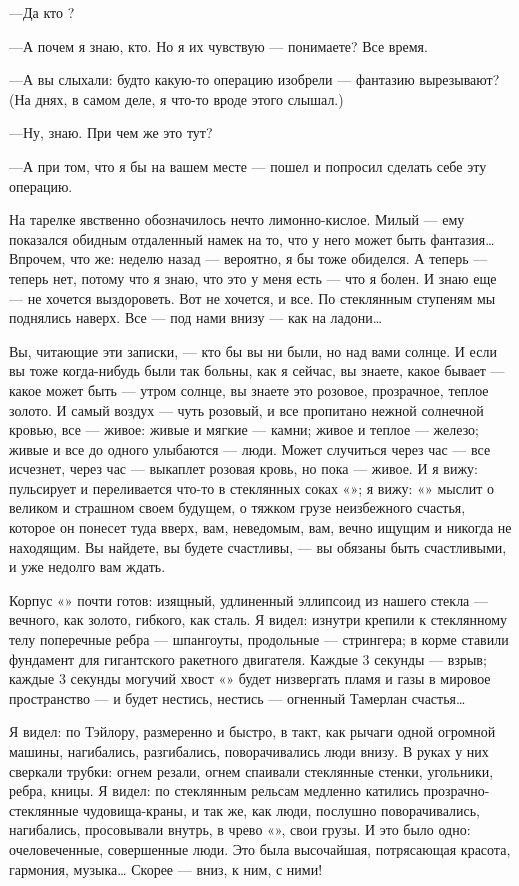 \documentclass[11pt,openany]{book}
\begin{document}
---Да кто ?

---А почем я знаю, кто. Но я их чувствую --- понимаете? Все время.

---А вы слыхали: будто какую-то операцию изобрели --- фантазию вырезывают? (На днях, в самом деле, я что-то вроде этого слышал.)

---Ну, знаю. При чем же это тут?

---А при том, что я бы на вашем месте --- пошел и попросил сделать себе эту операцию.

На тарелке явственно обозначилось нечто лимонно-кислое. Милый --- ему показался обидным отдаленный намек на то, что у него может быть фантазия\ldots{} Впрочем, что же: неделю назад --- вероятно, я бы тоже обиделся. А теперь --- теперь нет, потому что я знаю, что это у меня есть --- что я болен. И знаю еще --- не хочется выздороветь. Вот не хочется, и все. По стеклянным ступеням мы поднялись наверх. Все --- под нами внизу --- как на ладони\ldots{}

Вы, читающие эти записки, --- кто бы вы ни были, но над вами солнце. И если вы тоже когда-нибудь были так больны, как я сейчас, вы знаете, какое бывает --- какое может быть --- утром солнце, вы знаете это розовое, прозрачное, теплое золото. И самый воздух --- чуть розовый, и все пропитано нежной солнечной кровью, все --- живое: живые и мягкие --- камни; живое и теплое --- железо; живые и все до одного улыбаются --- люди. Может случиться через час --- все исчезнет, через час --- выкаплет розовая кровь, но пока --- живое. И я вижу: пульсирует и переливается что-то в стеклянных соках «»; я вижу: «» мыслит о великом и страшном своем будущем, о тяжком грузе неизбежного счастья, которое он понесет туда вверх, вам, неведомым, вам, вечно ищущим и никогда не находящим. Вы найдете, вы будете счастливы, --- вы обязаны быть счастливыми, и уже недолго вам ждать.

Корпус «» почти готов: изящный, удлиненный эллипсоид из нашего стекла --- вечного, как золото, гибкого, как сталь. Я видел: изнутри крепили к стеклянному телу поперечные ребра --- шпангоуты, продольные --- стрингера; в корме ставили фундамент для гигантского ракетного двигателя. Каждые 3 секунды --- взрыв; каждые 3 секунды могучий хвост «» будет низвергать пламя и газы в мировое пространство --- и будет нестись, нестись --- огненный Тамерлан счастья\ldots{}

Я видел: по Тэйлору, размеренно и быстро, в такт, как рычаги одной огромной машины, нагибались, разгибались, поворачивались люди внизу. В руках у них сверкали трубки: огнем резали, огнем спаивали стеклянные стенки, угольники, ребра, кницы. Я видел: по стеклянным рельсам медленно катились прозрачно-стеклянные чудовища-краны, и так же, как люди, послушно поворачивались, нагибались, просовывали внутрь, в чрево «», свои грузы. И это было одно: очеловеченные, совершенные люди. Это была высочайшая, потрясающая красота, гармония, музыка\ldots{} Скорее --- вниз, к ним, с ними!
\end{document}
